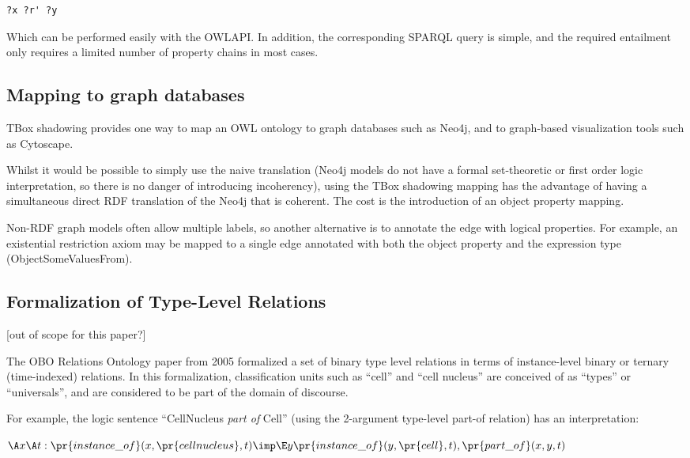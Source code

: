 \documentclass{my}
\def\partOf{\pr{part\_of}}
\def\instanceOf{\pr{instance\_of}}
\def\CellNucleus{\pr{cell nucleus}}
\def\Cell{\pr{cell}}
\begin{document}
\begin{verbatim}
?x ?r' ?y
\end{verbatim}

Which can be performed easily with the OWLAPI. In addition, the
corresponding SPARQL query is simple, and the required entailment only
requires a limited number of property chains in most cases.

\subsection{Mapping to graph databases}

TBox shadowing provides one way to map an OWL ontology to graph
databases such as Neo4j, and to graph-based visualization tools such
as Cytoscape.

Whilst it would be possible to simply use the naive translation (Neo4j
models do not have a formal set-theoretic or first order logic
interpretation, so there is no danger of introducing incoherency),
using the TBox shadowing mapping has the advantage of having a
simultaneous direct RDF translation of the Neo4j that is coherent. The
cost is the introduction of an object property mapping.

Non-RDF graph models often allow multiple labels, so another
alternative is to annotate the edge with logical properties. For
example, an existential restriction axiom may be mapped to a single
edge annotated with both the object property and the expression type
(ObjectSomeValuesFrom). 

\subsection{Formalization of Type-Level Relations}

[out of scope for this paper?]

The OBO Relations Ontology paper from 2005\cite{Smith2005} formalized
a set of binary type level relations in terms of instance-level binary
or ternary (time-indexed) relations. In this formalization,
classification units such as ``cell'' and ``cell nucleus'' are
conceived of as ``types'' or ``universals'', and are considered to be
part of the domain of discourse.

For example, the logic sentence ``CellNucleus \emph{part of} Cell''
(using the 2-argument type-level part-of relation) has an interpretation:

$
\A x \A t : \instanceOf(x, \CellNucleus, t) \imp \\
 \E y \instanceOf(y, \Cell, t), \partOf(x,y,t)
$
\end{document}
